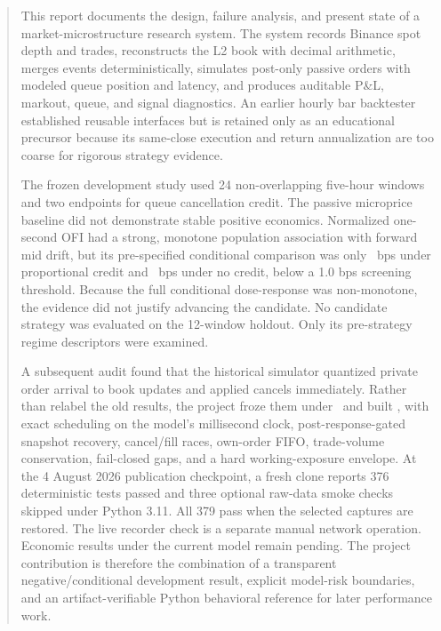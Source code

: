 \documentclass[11pt]{article}
\newcommand{\code}[1]{\texttt{\detokenize{#1}}}
\newcommand{\LegacyModel}{\code{legacy_book_update_v1}}
\newcommand{\CurrentModel}{\code{event_driven_v2}}
\begin{document}
\hypersetup{pageanchor=true}
\begin{abstract}
This report documents the design, failure analysis, and present state of a
market-microstructure research system. The system records Binance spot depth
and trades, reconstructs the L2 book with decimal arithmetic, merges events
deterministically, simulates post-only passive orders with modeled queue
position and latency, and produces auditable P\&L, markout, queue, and signal
diagnostics. An earlier hourly bar backtester established reusable interfaces
but is retained only as an educational precursor because its same-close
execution and return annualization are too coarse for rigorous strategy
evidence.

The frozen development study used 24 non-overlapping five-hour windows and two
endpoints for queue cancellation credit. The passive microprice baseline did not
demonstrate stable positive economics. Normalized one-second OFI had a strong,
monotone population association with forward mid drift, but its pre-specified
conditional comparison was only \OFIConditionalQcOne\ bps under proportional
credit and \OFIConditionalQcZero\ bps under no credit, below a 1.0 bps screening
threshold. Because the full conditional dose-response was non-monotone, the
evidence did not justify advancing the candidate. No candidate strategy was
evaluated on the 12-window holdout. Only its pre-strategy regime descriptors
were examined.

A subsequent audit found that the historical simulator quantized private order
arrival to book updates and applied cancels immediately. Rather than relabel the
old results, the project froze them under \LegacyModel\ and built
\CurrentModel, with exact scheduling on the model's millisecond clock,
post-response-gated snapshot recovery, cancel/fill races, own-order FIFO,
trade-volume conservation, fail-closed gaps, and a hard working-exposure
envelope. At the 4 August 2026 publication checkpoint, a fresh clone reports
376 deterministic tests passed and three optional raw-data smoke checks skipped
under Python 3.11. All 379 pass when the selected captures are restored. The live
recorder check is a separate manual network operation. Economic results under
the current model remain pending. The project contribution is therefore the combination of a transparent
negative/conditional development result, explicit model-risk boundaries, and
an artifact-verifiable Python behavioral reference for later performance work.
\end{abstract}

\tableofcontents
\clearpage
{}










\clearpage
\appendix


\clearpage


\end{document}
